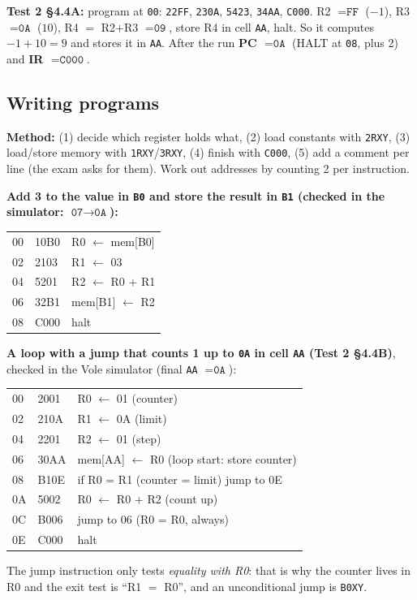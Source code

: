 \documentclass{fkt-notes}
\newcommand{\hx}[1]{\texttt{#1}}
\begin{document}
\textbf{Test 2 \S4.4A:} program at \hx{00}: \hx{22FF}, \hx{230A}, \hx{5423}, \hx{34AA}, \hx{C000}.
R2 $=\hx{FF}$ ($-1$), R3 $=\hx{0A}$ ($10$), R4 $=$ R2$+$R3 $=\hx{09}$, store R4 in cell \hx{AA}, halt.
So it computes $-1+10=9$ and stores it in \hx{AA}. After the run \textbf{PC $=\hx{0A}$} (HALT at \hx{08}, plus 2)
and \textbf{IR $=\hx{C000}$}.

\subsection{Writing programs}
\textbf{Method:} (1) decide which register holds what, (2) load constants with \hx{2RXY}, (3) load/store
memory with \hx{1RXY}/\hx{3RXY}, (4) finish with \hx{C000}, (5) add a comment per line (the exam
asks for them). Work out addresses by counting 2 per instruction.

\textbf{Add 3 to the value in \hx{B0} and store the result in \hx{B1} (checked in the simulator: $\hx{07}\to\hx{0A}$):}
\begin{center}
  \small\ttfamily
  \begin{tabular}{@{}lll@{}}
    00 & 10B0 & R0 $\leftarrow$ mem[B0] \\
    02 & 2103 & R1 $\leftarrow$ 03      \\
    04 & 5201 & R2 $\leftarrow$ R0 + R1 \\
    06 & 32B1 & mem[B1] $\leftarrow$ R2 \\
    08 & C000 & halt                    \\
  \end{tabular}
\end{center}

\textbf{A loop with a jump that counts 1 up to \hx{0A} in cell \hx{AA} (Test 2 \S4.4B)}, checked in the
Vole simulator (final \hx{AA} $=\hx{0A}$):
\begin{center}
  \small\ttfamily
  \begin{tabular}{@{}lll@{}}
    00 & 2001 & R0 $\leftarrow$ 01 \quad (counter)                        \\
    02 & 210A & R1 $\leftarrow$ 0A \quad (limit)                          \\
    04 & 2201 & R2 $\leftarrow$ 01 \quad (step)                           \\
    06 & 30AA & mem[AA] $\leftarrow$ R0 \quad (loop start: store counter) \\
    08 & B10E & if R0 = R1 (counter = limit) jump to 0E                   \\
    0A & 5002 & R0 $\leftarrow$ R0 + R2 \quad (count up)                  \\
    0C & B006 & jump to 06 \quad (R0 = R0, always)                        \\
    0E & C000 & halt                                                      \\
  \end{tabular}
\end{center}
The jump instruction only tests \emph{equality with R0}: that is why the counter lives in R0 and
the exit test is ``R1 $=$ R0'', and an unconditional jump is \hx{B0XY}.
\end{document}
